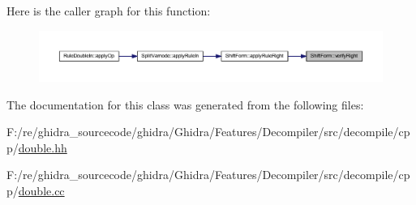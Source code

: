 Here is the caller graph for this function\+:
\nopagebreak
\begin{figure}[H]
\begin{center}
\leavevmode
\includegraphics[width=350pt]{class_shift_form_ae3063410d8b9584c9f0be3a345e0ee9c_icgraph}
\end{center}
\end{figure}


The documentation for this class was generated from the following files\+:\begin{DoxyCompactItemize}
\item 
F\+:/re/ghidra\+\_\+sourcecode/ghidra/\+Ghidra/\+Features/\+Decompiler/src/decompile/cpp/\mbox{\hyperlink{double_8hh}{double.\+hh}}\item 
F\+:/re/ghidra\+\_\+sourcecode/ghidra/\+Ghidra/\+Features/\+Decompiler/src/decompile/cpp/\mbox{\hyperlink{double_8cc}{double.\+cc}}\end{DoxyCompactItemize}
